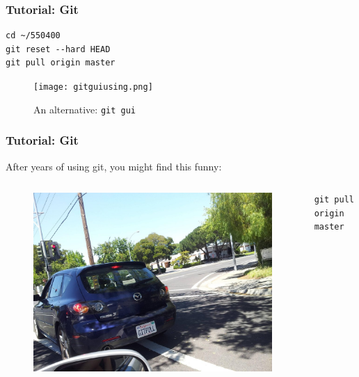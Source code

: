 \begin{frame}[fragile]
    \frametitle{Tutorial: Git}
\begin{lstlisting}
cd ~/550400
git reset --hard HEAD
git pull origin master
\end{lstlisting}
\begin{figure}[b]
    \centering
    \caption{An alternative: \texttt{git gui}}
        \texttt{[image: gitguiusing.png]}
    \label{fig:gitgui4}
\end{figure}
\end{frame}



\begin{frame}[fragile]
    \frametitle{Tutorial: Git}
    After years of using git, you might find this funny: 
    \begin{columns}
        \begin{column}{0.5\textwidth}
            \begin{figure}
                \begin{center}
                    \includegraphics[width=\textwidth]{images/gitpull.jpg}
                \end{center}
            \end{figure}
        \end{column}
        \begin{column}{0.5\textwidth}
            \begin{lstlisting}
git pull origin master
            \end{lstlisting}
        \end{column}
    \end{columns} 
\end{frame}

